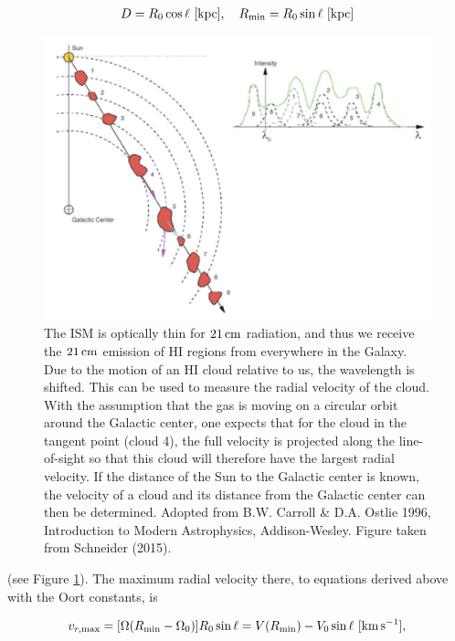 \documentclass[a4paper,10pt]{article}
\begin{document}
\begin{align*}
    D = R_0\cos\ell ~ [{\rm kpc}], ~~~ R_{\rm min} = R_0\sin\ell ~ [{\rm kpc}]
\end{align*}

\begin{figure}[t]
    \centering
    \includegraphics[width=12cm]{figures/TangentPoint.png}
    \caption{\footnotesize{The ISM is optically thin for $21\,{\rm cm}$ radiation, and thus we receive the $21\,{\rm cm}$ emission of HI regions from everywhere in the Galaxy. Due to the motion of an HI cloud relative to us, the wavelength is shifted. This can be used to measure the radial velocity of the cloud. With the assumption that the gas is moving on a circular orbit around the Galactic center, one expects that for the cloud in the tangent point (cloud 4), the full velocity is projected along the line-of-sight so that this cloud will therefore have the largest radial velocity. If the distance of the Sun to the Galactic center is known, the velocity of a cloud and its distance from the Galactic center can then be determined. Adopted from B.W. Carroll \& D.A. Ostlie 1996, Introduction to Modern Astrophysics, Addison-Wesley. Figure taken from Schneider (2015).}}
    \label{fig:tangentpoint}
\end{figure}

{\noindent}(see Figure \ref{fig:tangentpoint}). The maximum radial velocity there, to equations derived above with the Oort constants, is

\begin{align*}
v_{r,\mathrm{max}} = [\Omega(R_{\rm min}-\Omega_0)] R_0\sin\ell = V(R_{\rm min}) - V_0\sin\ell ~[{\rm km\,s^{-1}}],
\end{align*}
\end{document}
